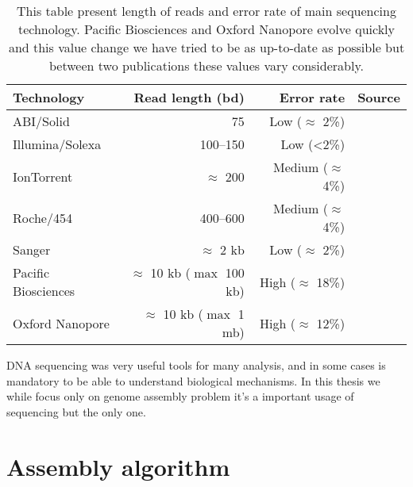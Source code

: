 \documentclass[./main.tex]{subfiles}
\begin{document}
\begin{table}[ht]
    \centering
    \begin{tabular}{l|rr|l}
         Technology          & Read length (bd)                 & Error rate    & Source                          \\ \hline
         ABI/Solid           & 75                               & Low ($\approx$ 2\%)    & \cite{seq_assembly_demystified} \\
         Illumina/Solexa     & 100–150                          & Low (<2\%)             & \cite{seq_assembly_demystified} \\
         IonTorrent          & $\approx$ 200                    & Medium ($\approx$ 4\%) & \cite{seq_assembly_demystified} \\
         Roche/454           & 400–600                          & Medium ($\approx$ 4\%) & \cite{seq_assembly_demystified} \\
         Sanger              & $\approx$ 2 kb                   & Low ($\approx$ 2\%)    & \cite{seq_assembly_demystified} \\
         Pacific Biosciences & $\approx$ 10 kb ($\max$ 100 kb)  & High ($\approx$ 18\%)  & \cite{seq_assembly_demystified} \cite{longread_dark_matter} \\
         Oxford Nanopore     & $\approx$ 10 kb ($\max$ 1 mb)    & High ($\approx$ 12\%)  & \cite{longread_dark_matter} \cite{nanopore_read_accuracy} \\
    \end{tabular}
    \caption{This table present length of reads and error rate of main sequencing technology. Pacific Biosciences and Oxford Nanopore evolve quickly and this value change we have tried to be as up-to-date as possible but between two publications these values vary considerably.}
    \label{intro:tab:technology_property}
\end{table}


DNA sequencing was very useful tools for many analysis, and in some cases is mandatory to be able to understand biological mechanisms. In this thesis we while focus only on genome assembly problem it's a important usage of sequencing but the only one.

\section{Assembly algorithm}
\end{document}
